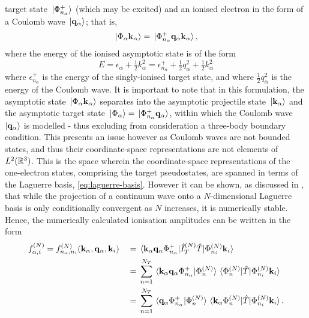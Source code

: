 \documentclass[]{article}
\begin{document}
target state $\ket*{\Phi_{n_{\alpha}}^{+}}$ (which may be excited) and an ionised
electron in the form of a Coulomb wave $\ket*{\vb{q}_{\alpha}}$; that is,
\begin{equation}
  \label{eq:asymptotic-ionised}
  \ket*{\Phi_{\alpha} \vb{k}_{\alpha}}
  =
  \ket*{\Phi_{n_{\alpha}}^{+} \vb{q}_{\alpha} \vb{k}_{\alpha}}
  ,
\end{equation}
where the energy of the ionised asymptotic state is of the form
\begin{equation}
  \label{eq:asymptotic-ionised-energy}
  E
  =
  \epsilon_{\alpha}
  +
  \tfrac{1}{2}
  k_{\alpha}^{2}
  =
  \epsilon_{n_{\alpha}}^{+}
  +
  \tfrac{1}{2}
  q_{\alpha}^{2}
  +
  \tfrac{1}{2}
  k_{\alpha}^{2}
\end{equation}
where $\epsilon_{n_{\alpha}}^{+}$ is the energy of the singly-ionised target
state, and where $\tfrac{1}{2} q_{\alpha}^{2}$ is the energy of the Coulomb
wave.
It is important to note that in this formulation, the asymptotic state
$\ket*{\Phi_{\alpha} \vb{k}_{\alpha}}$ separates into the asymptotic projectile
state $\ket*{\vb{k}_{\alpha}}$ and the asymptotic target state
$\ket*{\Phi_{\alpha}} = \ket*{\Phi_{n_{\alpha}}^{+} \vb{q}_{\alpha}}$, within
which the Coulomb wave $\ket{\vb{q}_{\alpha}}$ is modelled - thus excluding from
consideration a three-body boundary condition.
This presents an issue however as Coulomb waves are not bounded states, and
thus their coordinate-space representations are not elements of
$L^{2}(\mathbb{R}^{3})$.
This is the space wherein the coordinate-space representations of the
one-electron states, comprising the target pseudostates, are spanned in terms of
the Laguerre basis, \eqref{eq:laguerre-basis}.
However it can be shown, as discussed in \cite{BRAY19951}, that while the
projection of a continuum wave onto a $N$-dimensional Laguerre basis is only
conditionally convergent as $N$ increases, it is numerically stable.
Hence, the numerically calculated ionisation amplitudes can be written in the
form
\begin{alignat}{2}
  \label{eq:scattering-amplitude-ionisation}
  &
  f_{\alpha, i}^{(N)}
  =
  f_{n_{\alpha}, n_{i}}^{(N)}(
    \vb{k}_{\alpha}, \vb{q}_{\alpha}, \vb{k}_{i}
  )
  &
  {}={}
  &
  \mel*
  {\vb{k}_{\alpha} \vb{q}_{\alpha} \Phi_{n_{\alpha}}^{+}}
  {\hat{I}_{T}^{(N)} \hat{T}}
  {\Phi_{n_{i}}^{(N)} \vb{k}_{i}}
  \nonumber
  \\
  &
  &
  {}={}
  &
  \sum_{n = 1}^{N_{T}}
  \braket*
  {\vb{k}_{\alpha} \vb{q}_{\alpha} \Phi_{n_{\alpha}}^{+}}
  {\Phi_{n}^{(N)}}
  \mel*
  {\Phi_{n}^{(N)}}
  {\hat{T}}
  {\Phi_{n_{i}}^{(N)} \vb{k}_{i}}
  \nonumber
  \\
  &
  &
  {}={}
  &
  \sum_{n = 1}^{N_{T}}
  \braket*
  {\vb{q}_{\alpha} \Phi_{n_{\alpha}}^{+}}
  {\Phi_{n}^{(N)}}
  \mel*
  {\vb{k}_{\alpha} \Phi_{n}^{(N)}}
  {\hat{T}}
  {\Phi_{n_{i}}^{(N)} \vb{k}_{i}}
  .
\end{alignat}
\end{document}

